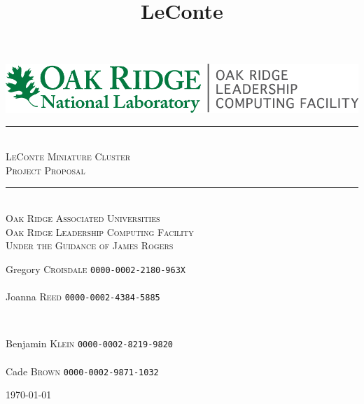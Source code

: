 \documentclass{article}
\title{LeConte}
\begin{document}
\begin{titlepage}
 \center
 \includegraphics[scale=1.5]{OLCF_color.png}\\[2cm]
 \newcommand{\sep}{\rule{\linewidth}{0.5mm}}
 \sep \\[0.4cm]
 \textsc{\huge LeConte Miniature Cluster}\\[0.4cm]
 \textsc{\large Project Proposal}\\[0.4cm]
 \sep \\[2cm]
 \textsc{\LARGE Oak Ridge Associated Universities}\\[0.5cm]
 \textsc{\Large Oak Ridge Leadership Computing Facility}\\[0.5cm]
 \textsc{\large Under the Guidance of James Rogers}\\[4.6cm]

\vfill
\begin{minipage}{0.4\textwidth}
\begin{flushleft} \large
Gregory \textsc{Croisdale} \texttt{0000-0002-2180-963X}\\~\\
Joanna \textsc{Reed} \texttt{0000-0002-4384-5885}\\
\end{flushleft}
\end{minipage}
~
\begin{minipage}{0.4\textwidth}
\begin{flushright} \large
Benjamin \textsc{Klein} \texttt{0000-0002-8219-9820}\\~\\
Cade \textsc{Brown} \texttt{0000-0002-9871-1032}\\
\end{flushright}
\end{minipage}
{\large \vfill \vspace*{\fill} \today}
\end{titlepage}
\end{document}
